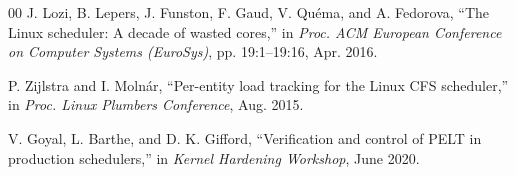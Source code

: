 \documentclass[conference]{IEEEtran}
\begin{document}
\begin{thebibliography}{00}
 J. Lozi, B. Lepers, J. Funston, F. Gaud, V. Quéma, and A. Fedorova, ``The Linux scheduler: A decade of wasted cores,'' in \textit{Proc. ACM European Conference on Computer Systems (EuroSys)}, pp. 19:1--19:16, Apr. 2016.

 P. Zijlstra and I. Molnár, ``Per-entity load tracking for the Linux CFS scheduler,'' in \textit{Proc. Linux Plumbers Conference}, Aug. 2015.

 V. Goyal, L. Barthe, and D. K. Gifford, ``Verification and control of PELT in production schedulers,'' in \textit{Kernel Hardening Workshop}, June 2020.

\end{thebibliography}
\end{document}
